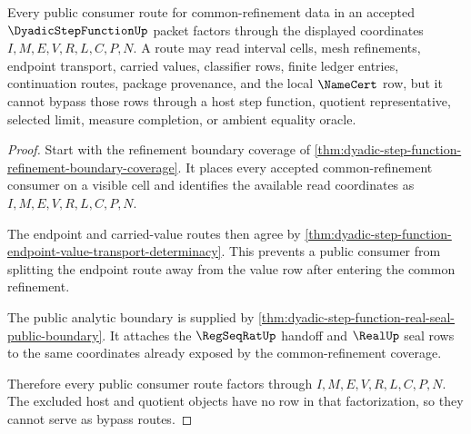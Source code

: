 \begin{theorem}
\label{thm:dyadic-step-function-common-refinement-public-route}
Every public consumer route for common-refinement data in an accepted $\DyadicStepFunctionUp$ packet factors through the displayed coordinates $I,M,E,V,R,L,C,P,N$. A route may read interval cells, mesh refinements, endpoint transport, carried values, classifier rows, finite ledger entries, continuation routes, package provenance, and the local $\NameCert$ row, but it cannot bypass those rows through a host step function, quotient representative, selected limit, measure completion, or ambient equality oracle.
\end{theorem}
\begin{proof}
Start with the refinement boundary coverage of \autoref{thm:dyadic-step-function-refinement-boundary-coverage}. It places every accepted common-refinement consumer on a visible cell and identifies the available read coordinates as $I,M,E,V,R,L,C,P,N$.

The endpoint and carried-value routes then agree by \autoref{thm:dyadic-step-function-endpoint-value-transport-determinacy}. This prevents a public consumer from splitting the endpoint route away from the value row after entering the common refinement.

The public analytic boundary is supplied by \autoref{thm:dyadic-step-function-real-seal-public-boundary}. It attaches the $\RegSeqRatUp$ handoff and $\RealUp$ seal rows to the same coordinates already exposed by the common-refinement coverage.

Therefore every public consumer route factors through $I,M,E,V,R,L,C,P,N$. The excluded host and quotient objects have no row in that factorization, so they cannot serve as bypass routes.
\end{proof}

